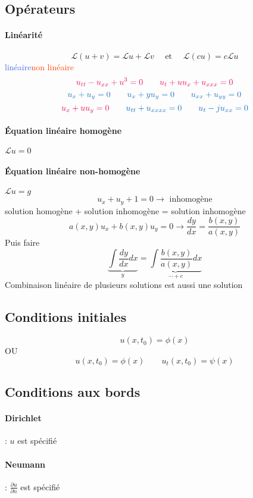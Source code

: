 \documentclass[resume]{subfiles}
\begin{document}
\subsection{Opérateurs}
\paragraph{Linéarité}
$$\mathcal{L}(u+v)=\mathcal{L}u+\mathcal{L}v\quad \text{ et }\quad \mathcal{L}(cu)=c\mathcal{L}u$$
\hfill \textcolor{RoyalBlue}{linéaire}\hfill \textcolor{OrangeRed}{non linéaire}\hfill \
$$\textcolor{OrangeRed}{u_{tt}-u_{xx}+u^3=0}\qquad \textcolor{OrangeRed}{u_t+uu_x+u_{xxx}=0}$$
$$\textcolor{RoyalBlue}{u_x+u_y=0}\qquad \textcolor{RoyalBlue}{u_x+yu_y=0}\qquad\textcolor{RoyalBlue}{u_{xx}+u_{yy}=0}$$
$$\textcolor{OrangeRed}{u_x+uu_y=0}\qquad \textcolor{RoyalBlue}{u_{tt}+u_{xxxx}=0}\qquad \textcolor{RoyalBlue}{u_t-ju_{xx}=0}$$


\paragraph{Équation linéaire homogène} $\mathcal{L}u=0$
\paragraph{Équation linéaire non-homogène} $\mathcal{L}u=g$
$$u_x+u_y+1=0\longrightarrow \text{ inhomogène}$$
solution homogène + solution inhomogène = solution inhomogène
$$\boxed{a(x,y)u_x+b(x,y)u_y=0\longrightarrow \frac{dy}{dx}=\frac{b(x,y)}{a(x,y)}}$$
Puis faire
$$\underbrace{\int \frac{dy}{dx}dx}_{y}=\underbrace{\int \frac{b(x,y)}{a(x,y)}dx}_{\cdots + c}$$
Combinaison linéaire de plusieurs solutions est aussi une solution
\subsection{Conditions initiales}
$$u(x,t_0)=\phi(x)$$
OU
$$u(x,t_0)=\phi(x)\qquad u_t(x,t_0)=\psi(x)$$
\subsection{Conditions aux bords}
\paragraph{Dirichlet} : $u$ est spécifié
\paragraph{Neumann} : $\frac{\partial u}{\partial n}$ est spécifié
\end{document}
